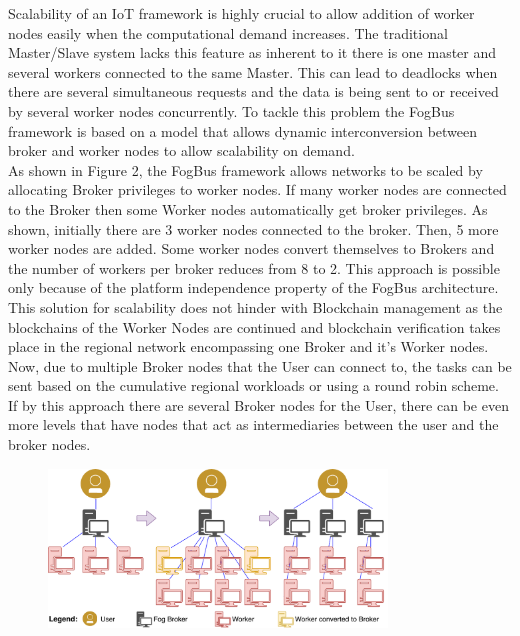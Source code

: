 \documentclass[10pt,journal,compsoc]{IEEEtran}
\begin{document}
Scalability of an IoT framework is highly crucial to allow addition of worker nodes easily when the computational demand increases. The traditional Master/Slave system lacks this feature as inherent to it there is one master and several workers connected to the same Master. This can lead to deadlocks when there are several simultaneous requests and the data is being sent to or received by several worker nodes concurrently. To tackle this problem the FogBus framework is based on a model that allows dynamic interconversion between broker and worker nodes to allow scalability on demand. \\
As shown in Figure 2, the FogBus framework allows networks to be scaled by allocating Broker privileges to worker nodes. If many worker nodes are connected to the Broker then some Worker nodes automatically get broker privileges. As shown, initially there are 3 worker nodes connected to the broker. Then, 5 more worker nodes are added. Some worker nodes convert themselves to Brokers and the number of workers per broker reduces from 8 to 2. This approach is possible only because of the platform independence property of the FogBus architecture. \\
This solution for scalability does not hinder with Blockchain management as the blockchains of the Worker Nodes are continued and blockchain verification takes place in the regional network encompassing one Broker and it's Worker nodes. Now, due to multiple Broker nodes that the User can connect to, the tasks can be sent based on the cumulative regional workloads or using a round robin scheme. If by this approach there are several Broker nodes for the User, there can be even more levels that have nodes that act as intermediaries between the user and the broker nodes.

\begin{figure}[h]
\centering
\includegraphics[width=9cm]{scalability}
\end{figure}
\end{document}
